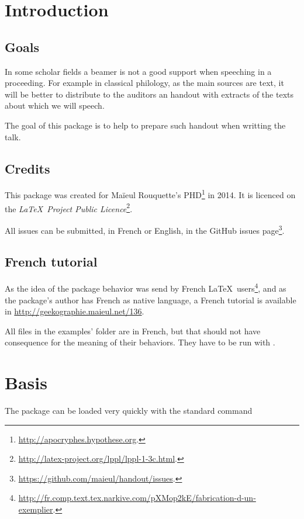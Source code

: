 \documentclass{ltxdockit}[2011/03/25]
\begin{document}
\printtitlepage
\tableofcontents

\section{Introduction}
\subsection{Goals}

In some scholar fields a beamer is not a good support when speeching in a proceeding. For example in classical philology, as the main sources are text, it will be better to distribute to the auditors an handout with extracts of the texts about which we will speech.

The goal of this package is to help to prepare such handout when writting the talk.

\subsection{Credits}

This package was created for Maïeul Rouquette's PHD\footnote{\url{http://apocryphes.hypothese.org}.} in 2014. It is licenced on the \emph{\LaTeX\ Project Public Licence}\footnote{\url{http://latex-project.org/lppl/lppl-1-3c.html}.}.

All issues can be submitted, in French or English, in the GitHub issues page\footnote{\url{https://github.com/maieul/handout/issues}.}.

\subsection{French tutorial}

As the idea of the package behavior was send by French \LaTeX\ users\footnote{\url{http://fr.comp.text.tex.narkive.com/pXMop2kE/fabrication-d-un-exemplier}.}, and as the package's author has French as native language, a French tutorial is available in \url{http://geekographie.maieul.net/136}. 

All files in the examples' folder are in French, but that should not have consequence for the meaning of their behaviors. They  have to be run with \XeLaTeX.


\section{Basis}

The package can be loaded very quickly with the standard command 
\end{document}
